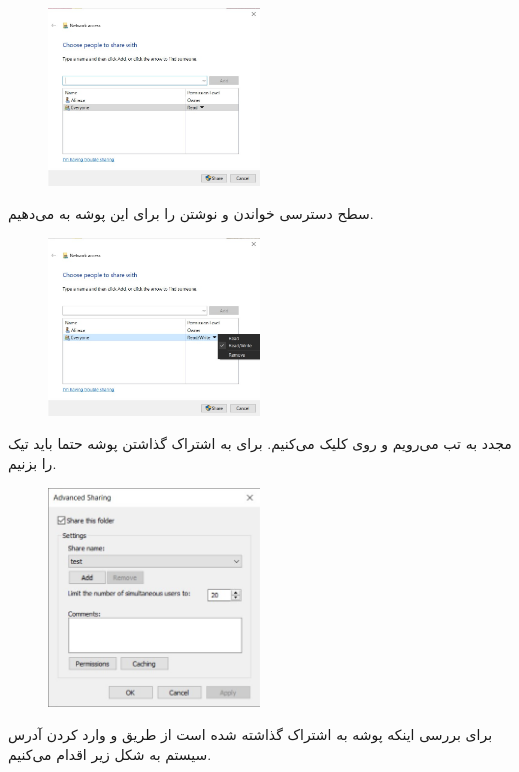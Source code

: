 \documentclass{article}
\begin{document}
\begin{figure}[H]
    \centering
    \includegraphics[width=0.5\textwidth]{figures/2.3.jpg}
    \caption
	{
	}
    \label{fig:fig1}
\end{figure}
سطح دسترسی خواندن و نوشتن را برای این پوشه به  می‌دهیم.
\begin{figure}[H]
    \centering
    \includegraphics[width=0.5\textwidth]{figures/2.4.jpg}
    \caption
	{
	}
    \label{fig:fig1}
\end{figure}
مجدد به تب  می‌رویم و روی  کلیک می‌کنیم. برای به اشتراک گذاشتن پوشه حتما باید تیک  را بزنیم.
\begin{figure}[H]
    \centering
    \includegraphics[width=0.5\textwidth]{figures/2.5.jpg}
    \caption
	{
	}
    \label{fig:fig1}
\end{figure}
برای بررسی اینکه پوشه به اشتراک گذاشته شده است از طریق  و وارد کردن آدرس سیستم به شکل زیر اقدام می‌کنیم.
\end{document}
